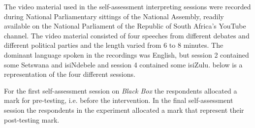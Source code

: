 \documentclass[output=paper]{langsci/langscibook}
\begin{document}
The video material used in the self-assessment interpreting sessions were recorded during National Parliamentary sittings of the National Assembly, readily available on the National Parliament of the Republic of South Africa’s YouTube channel. The video material consisted of four speeches from different debates and different political parties and the length varied from 6 to 8 minutes. The dominant language spoken in the recordings was English, but session 2 contained some Setswana and isiNdebele and session 4 contained some isiZulu.  below is a representation of the four different sessions.

\begin{table}
\caption{\label{tab:deysel:3}Summary of the different interpreting sessions}
\end{table}

For the first self-assessment session on \textit{Black Box} the respondents allocated a mark for pre-testing, i.e. before the intervention. In the final self-assessment session the respondents in the experiment allocated a mark that represent their post-testing mark. 
\end{document}
